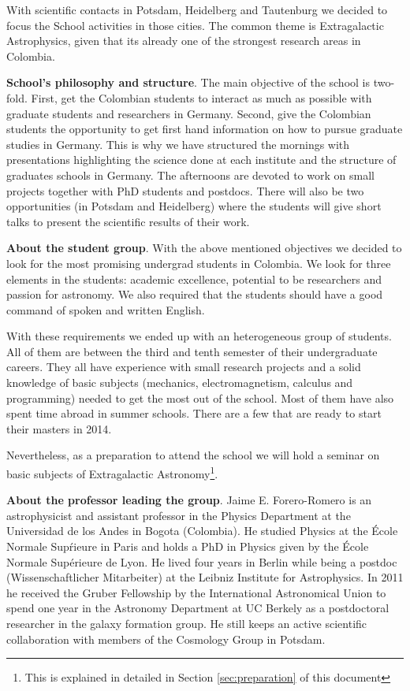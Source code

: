 \documentclass[12pt]{article}
\begin{document}
With scientific contacts in Potsdam, Heidelberg and Tautenburg we
decided to focus the School activities in those cities. The common theme is
Extragalactic Astrophysics, given that its already one of the
strongest research areas in Colombia. 

{\bf School's philosophy and structure}. The main objective of the school is
two-fold. First, get the Colombian students to interact as much as possible with
graduate students and researchers in Germany. Second, give the
Colombian students the opportunity to get first
hand information on how to pursue graduate studies in Germany.  This
is why we have structured the mornings with presentations highlighting
the science done at each institute and the structure of graduates
schools in Germany. The afternoons are devoted to work on small
projects together with PhD students and postdocs. There will also be
two opportunities (in Potsdam and Heidelberg) where the
students will give short talks to present the scientific results of
their work.

{\bf About the student group}. With the above mentioned objectives we
decided to look for the most promising undergrad students in
Colombia.  We look for three elements in the students: academic
excellence, potential to be researchers and passion for astronomy. We
also required that the students should have a good command of spoken
and written English.

With these requirements we ended up with an heterogeneous group of
students. All of them are between the third and tenth semester of
their undergraduate careers. They all have experience with small
research projects and a solid knowledge of basic subjects 
(mechanics, electromagnetism, calculus and programming) needed to
get the most out of the school. Most of them have also spent
time abroad in summer schools.  There are a few that are ready to
start their masters in 2014. 

Nevertheless, as a preparation to attend the school we will hold a
seminar on basic subjects of Extragalactic Astronomy\footnote{This is
  explained in detailed in Section   \ref{sec:preparation} of this
  document}. 


{\bf About the professor leading the group}. Jaime E. Forero-Romero
is an astrophysicist and assistant professor in the Physics Department
at the Universidad de los Andes in Bogota (Colombia). He studied
Physics at the \'Ecole Normale Sup\'rieure in Paris and holds a PhD in
Physics given by the \'Ecole Normale Supérieure de Lyon. He lived four 
years in Berlin while being a postdoc (Wissenschaftlicher Mitarbeiter)
at the Leibniz Institute for Astrophysics. In 2011 he received the Gruber Fellowship by the
International Astronomical Union to spend one year in the Astronomy
Department at UC Berkely as a postdoctoral researcher in the galaxy
formation group. He still keeps an active scientific collaboration
with members of the Cosmology Group in Potsdam.
\end{document}
